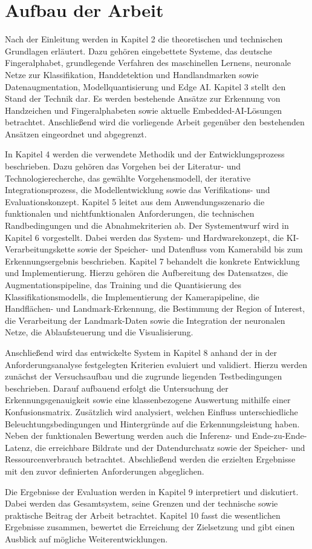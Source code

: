 \section{Aufbau der Arbeit}\label{sec:aufbau-der-arbeit}

Nach der Einleitung werden in Kapitel 2 die theoretischen und technischen Grundlagen erläutert. Dazu gehören eingebettete Systeme, das deutsche Fingeralphabet, grundlegende Verfahren des maschinellen Lernens, neuronale Netze zur Klassifikation, Handdetektion und Handlandmarken sowie Datenaugmentation, Modellquantisierung und Edge AI. Kapitel 3 stellt den Stand der Technik dar. Es werden bestehende Ansätze zur Erkennung von Handzeichen und Fingeralphabeten sowie aktuelle Embedded-AI-Lösungen betrachtet. Anschließend wird die vorliegende Arbeit gegenüber den bestehenden Ansätzen eingeordnet und abgegrenzt.

In Kapitel 4 werden die verwendete Methodik und der Entwicklungsprozess beschrieben. Dazu gehören das Vorgehen bei der Literatur- und Technologierecherche, das gewählte Vorgehensmodell, der iterative Integrationsprozess, die Modellentwicklung sowie das Verifikations- und Evaluationskonzept. Kapitel 5 leitet aus dem Anwendungsszenario die funktionalen und nichtfunktionalen Anforderungen, die technischen Randbedingungen und die Abnahmekriterien ab. Der Systementwurf wird in Kapitel 6 vorgestellt. Dabei werden das System- und Hardwarekonzept, die KI-Verarbeitungskette sowie der Speicher- und Datenfluss vom Kamerabild bis zum Erkennungsergebnis beschrieben. Kapitel 7 behandelt die konkrete Entwicklung und Implementierung. Hierzu gehören die Aufbereitung des Datensatzes, die Augmentationspipeline, das Training und die Quantisierung des Klassifikationsmodells, die Implementierung der Kamerapipeline, die Handflächen- und Landmark-Erkennung, die Bestimmung der Region of Interest, die Verarbeitung der Landmark-Daten sowie die Integration der neuronalen Netze, die Ablaufsteuerung und die Visualisierung.

Anschließend wird das entwickelte System in Kapitel 8 anhand der in der Anforderungsanalyse festgelegten Kriterien evaluiert und validiert. Hierzu werden zunächst der Versuchsaufbau und die zugrunde liegenden Testbedingungen beschrieben. Darauf aufbauend erfolgt die Untersuchung der Erkennungsgenauigkeit sowie eine klassenbezogene Auswertung mithilfe einer Konfusionsmatrix. Zusätzlich wird analysiert, welchen Einfluss unterschiedliche Beleuchtungsbedingungen und Hintergründe auf die Erkennungsleistung haben. Neben der funktionalen Bewertung werden auch die Inferenz- und Ende-zu-Ende-Latenz, die erreichbare Bildrate und der Datendurchsatz sowie der Speicher- und Ressourcenverbrauch betrachtet. Abschließend werden die erzielten Ergebnisse mit den zuvor definierten Anforderungen abgeglichen.

Die Ergebnisse der Evaluation werden in Kapitel 9 interpretiert und diskutiert. Dabei werden das Gesamtsystem, seine Grenzen und der technische sowie praktische Beitrag der Arbeit betrachtet. Kapitel 10 fasst die wesentlichen Ergebnisse zusammen, bewertet die Erreichung der Zielsetzung und gibt einen Ausblick auf mögliche Weiterentwicklungen.
